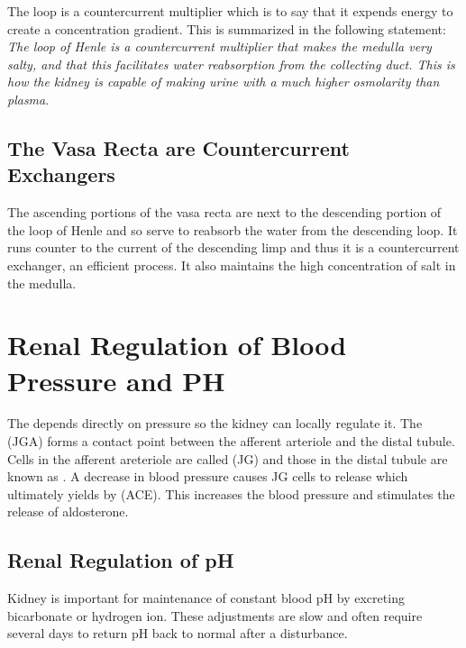 \documentclass[../Bio_chemistryReview.tex]{subfiles}
\begin{document}
The loop is a countercurrent multiplier which is to say that it expends energy
to create a concentration gradient. This is summarized in the following
statement: \textit{The loop of Henle is a countercurrent multiplier that makes
the medulla very salty, and that this facilitates water reabsorption from the
collecting duct. This is how the kidney is capable of making urine with a much
higher osmolarity than plasma}. 

\subsection{The Vasa Recta are Countercurrent Exchangers}
The ascending portions of the vasa recta are next to the descending portion of
the loop of Henle and so serve to reabsorb the water from the descending loop.
It runs counter to the current of the descending limp and thus it is a
countercurrent exchanger, an efficient process. It also maintains the high
concentration of salt in the medulla.

\section{Renal Regulation of Blood Pressure and PH}
The  depends directly on pressure so the
kidney can locally regulate it. The  (JGA) forms a contact point between the afferent arteriole and the distal
tubule. Cells in the afferent areteriole are called  (JG) and those in the distal tubule are known as . A
decrease in blood pressure causes JG cells to release  which
ultimately yields  by  (ACE). This increases the blood pressure and stimulates the release of
aldosterone. 

\subsection{Renal Regulation of pH}
Kidney is important for maintenance of constant blood pH by excreting
bicarbonate or hydrogen ion. These adjustments are slow and often require
several days to return pH back to normal after a disturbance.
\end{document}
